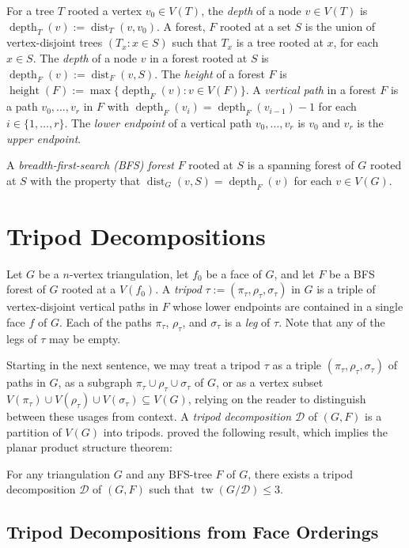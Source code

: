 \documentclass{patmorin}
\DeclareMathOperator{\tw}{tw}
\DeclareMathOperator{\height}{height}
\DeclareMathOperator{\depth}{depth}
\DeclareMathOperator{\dist}{dist}
\begin{document}
For a tree $T$ rooted a vertex $v_0\in V(T)$, the \emph{depth} of a node $v\in V(T)$ is $\depth_T(v):=\dist_T(v,v_0)$.  A forest, $F$ rooted at a set $S$ is the union of vertex-disjoint trees $(T_x:x\in S)$ such that $T_x$ is a tree rooted at $x$, for each $x\in S$.  The \emph{depth} of a node $v$ in a forest rooted at $S$ is $\depth_F(v):=\dist_F(v,S)$.  The \emph{height} of a forest $F$ is $\height(F):=\max\{\depth_F(v):v\in V(F)\}$.  A \emph{vertical path} in a forest $F$ is a path $v_0,\ldots,v_r$ in $F$ with $\depth_F(v_i)=\depth_F(v_{i-1})-1$ for each $i\in\{1,\ldots,r\}$.  The \emph{lower endpoint} of a vertical path $v_0,\ldots,v_r$ is $v_0$ and $v_r$ is the \emph{upper endpoint}.

A \emph{breadth-first-search (BFS) forest} $F$ rooted at $S$ is a spanning forest of $G$ rooted at $S$ with the property that $\dist_G(v,S)=\depth_F(v)$ for each $v\in V(G)$.


\section{Tripod Decompositions}


Let $G$ be a $n$-vertex triangulation, let $f_0$ be a face of $G$, and let $F$ be a BFS forest of $G$ rooted at a $V(f_0)$.  A \emph{tripod} $\tau:=(\pi_\tau,\rho_\tau,\sigma_\tau)$ in $G$ is a triple of vertex-disjoint vertical paths in $F$ whose lower endpoints are contained in a single face $f$ of $G$.  Each of the paths $\pi_\tau$, $\rho_\tau$, and $\sigma_\tau$ is a \emph{leg} of $\tau$. Note that any of the legs of $\tau$ may be empty.

Starting in the next sentence, we may treat a tripod $\tau$ as a triple $(\pi_\tau,\rho_\tau,\sigma_\tau)$ of paths  in $G$, as a subgraph $\pi_\tau\cup\rho_\tau\cup\sigma_\tau$ of $G$, or as a vertex subset $V(\pi_\tau)\cup V(\rho_\tau)\cup V(\sigma_\tau)\subseteq V(G)$, relying on the reader to distinguish between these usages from context.  A \emph{tripod decomposition} $\mathcal{D}$ of $(G,F)$ is a partition of $V(G)$ into tripods.  \citet{dujmovic.joret.ea:planar} proved the following result, which implies the planar product structure theorem:

\begin{thm}\label{tripod_decomposition}
  For any triangulation $G$ and any BFS-tree $F$ of $G$, there exists a tripod decomposition $\mathcal{D}$ of $(G,F)$ such that $\tw(G/\mathcal{D})\le 3$.
\end{thm}

\subsection{Tripod Decompositions from Face Orderings}
\end{document}
